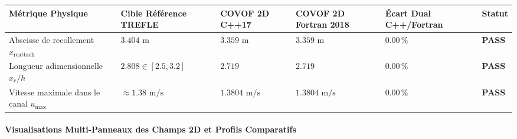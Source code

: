 \documentclass[
  10pt,
]{article}
\newcounter{none} %
\begin{document}
{\def\LTcaptype{none} %
\begin{longtable}[]{@{}
  >{\raggedright\arraybackslash}p{}
  >{\centering\arraybackslash}p{}
  >{\centering\arraybackslash}p{}
  >{\centering\arraybackslash}p{}
  >{\centering\arraybackslash}p{}
  >{\centering\arraybackslash}p{}@{}}
\toprule\noalign{}
\begin{minipage}[b]{\linewidth}\raggedright
Métrique Physique
\end{minipage} & \begin{minipage}[b]{\linewidth}\centering
Cible Référence TREFLE
\end{minipage} & \begin{minipage}[b]{\linewidth}\centering
COVOF 2D C++17
\end{minipage} & \begin{minipage}[b]{\linewidth}\centering
COVOF 2D Fortran 2018
\end{minipage} & \begin{minipage}[b]{\linewidth}\centering
Écart Dual C++/Fortran
\end{minipage} & \begin{minipage}[b]{\linewidth}\centering
Statut
\end{minipage} \\
\midrule\noalign{}
\endhead
\bottomrule\noalign{}
\endlastfoot
Abscisse de recollement \(x_{\text{reattach}}\) & \(3.404\text{ m}\) &
\textbf{\(3.359\text{ m}\)} & \textbf{\(3.359\text{ m}\)} &
\textbf{\(0.00\,\%\)} & \textbf{PASS} \\
Longueur adimensionnelle \(x_r / h\) & \(2.808 \in [2.5, 3.2]\) &
\textbf{\(2.719\)} & \textbf{\(2.719\)} & \textbf{\(0.00\,\%\)} &
\textbf{PASS} \\
Vitesse maximale dans le canal \(u_{\max}\) &
\(\approx 1.38\text{ m/s}\) & \textbf{\(1.3804\text{ m/s}\)} &
\textbf{\(1.3804\text{ m/s}\)} & \textbf{\(0.00\,\%\)} &
\textbf{PASS} \\
\end{longtable}
}

\paragraph{Visualisations Multi-Panneaux des Champs 2D et Profils
Comparatifs}\label{visualisations-multi-panneaux-des-champs-2d-et-profils-comparatifs-5}
\end{document}
